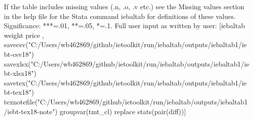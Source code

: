 If the table includes missing values (.n, .o, .v etc.) see the Missing values section in the help file for the Stata command iebaltab for definitions of these values. Significance: ***=.01, **=.05, *=.1. Full user input as written by user: [iebaltab weight price , savecsv("C:/Users/wb462869/github/ietoolkit/run/iebaltab/outputs/iebaltab1/iebt-csv18") savexlsx("C:/Users/wb462869/github/ietoolkit/run/iebaltab/outputs/iebaltab1/iebt-xlsx18") savetex("C:/Users/wb462869/github/ietoolkit/run/iebaltab/outputs/iebaltab1/iebt-tex18") texnotefile("C:/Users/wb462869/github/ietoolkit/run/iebaltab/outputs/iebaltab1/iebt-tex18-note") groupvar(tmt\_cl) replace stats(pair(diff))] 
